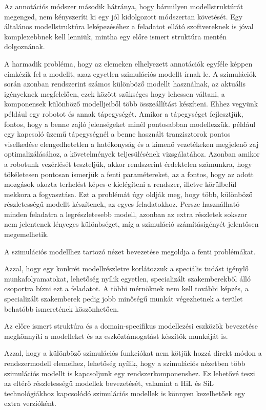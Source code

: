         Az annotációs módszer második hátránya, hogy bármilyen modellstruktúrát megenged, nem kényszeríti ki egy jól kidolgozott módszertan követését.
        Egy általános modellstruktúra leképezéséhez a feladatot ellátó szoftvereknek is jóval komplexebbnek kell lenniük, mintha egy előre ismert struktúra mentén dolgoznának.

        A harmadik probléma, hogy az elemeken elhelyezett annotációk egyféle képpen címkézik fel a modellt, azaz egyetlen szimulációs modellt írnak le.
        A szimulációk során azonban rendszerint számos különböző modellt használnak, az aktuális igényeknek megfelelően, ezek között szükséges hogy lehessen váltani, a komponensek különböző modelljeiből több összeállítást készíteni.
        Ehhez vegyünk például egy robotot és annak tápegységét.
        Amikor a tápegységet fejlesztjük, fontos, hogy a benne zajló jelenségeket minél pontosabban modellezzük. például egy kapcsoló üzemű tápegységnél a benne használt tranzisztorok pontos viselkedése elengedhetetlen a hatékonyság és a kimenő vezetékeken megjelenő zaj optimalizálásához, a követelmények teljesülésének vizsgálatához.
        Azonban amikor a robotunk vezérlését teszteljük, akkor rendszerint érdektelen számunkra, hogy tökéletesen pontosan ismerjük a fenti paramétereket, az a fontos, hogy az adott mozgások okozta terhelést képes-e kielégíteni a rendszer, illetve körülbelül mekkora a fogyasztása.
        Ezt a problémát úgy oldják meg, hogy több, különböző részletességű modellt készítenek, az egyes feladatokhoz.
        Persze használható minden feladatra a legrészletesebb modell, azonban az extra részletek sokszor nem jelentenek lényeges különbséget, míg a szimuláció számításigényét jelentősen megemelhetik.

        A szimulációs modellhez tartozó nézet bevezetése megoldja a fenti problémákat.

        Azzal, hogy egy konkrét modellrészletre korlátozzuk a speciális tudást igénylő munkafolyamatokat, lehetőség nyílik egyetlen, specializált szakemberekből álló csoportra bízni ezt a feladatot.
        A többi mérnöknek nem kell további képzés, a specializált szakemberek pedig jobb minőségű munkát végezhetnek a terület behatóbb ismeretének köszönhetően.

        Az előre ismert struktúra és a domain-specifikus modellezési eszközök bevezetése megkönnyíti a modelleket és az eszköztámogatást készítők munkáját is.

        Azzal, hogy a különböző szimulációs funkciókat nem kötjük hozzá direkt módon a rendszermodell elemeihez, lehetőség nyílik, hogy a szimulációs nézetben több szimulációs modellt is kapcsoljunk egy rendszerkomponenshez.
        Ez lehetővé teszi az eltérő részletességű modellek bevezetését, valamint a HiL és SiL technológiákhoz kapcsolódó szimulációs modellek is könnyen kezelhetőek egy extra verzióként.

